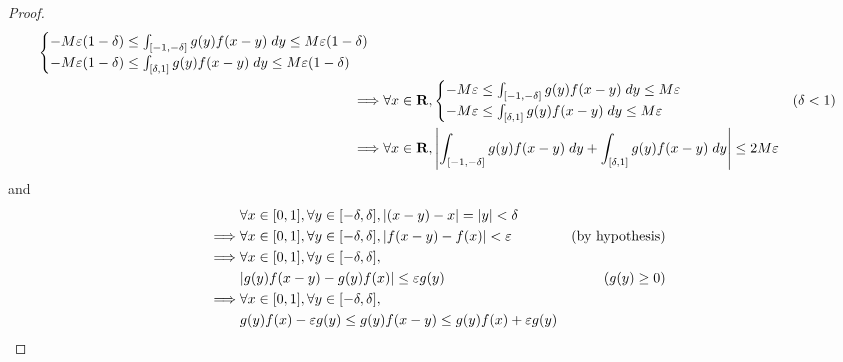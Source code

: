\begin{proof}
\begin{align*}
\begin{cases}
                                                 -M \varepsilon (1 - \delta) \leq \int_{[-1, -\delta]} g(y) f(x - y) \; dy \leq M \varepsilon (1 - \delta) \\
                                                 -M \varepsilon (1 - \delta) \leq \int_{[\delta, 1]} g(y) f(x - y) \; dy \leq M \varepsilon (1 - \delta)
                                             \end{cases} \\
        \implies & \forall x \in \mathbf{R}, \begin{cases}
                                                 -M \varepsilon \leq \int_{[-1, -\delta]} g(y) f(x - y) \; dy \leq M \varepsilon \\
                                                 -M \varepsilon \leq \int_{[\delta, 1]} g(y) f(x - y) \; dy \leq M \varepsilon
                                             \end{cases}                            & (\delta < 1)                           \\
        \implies & \forall x \in \mathbf{R}, \abs*{\int_{[-1, -\delta]} g(y) f(x - y) \; dy + \int_{[\delta, 1]} g(y) f(x - y) \; dy} \leq 2 M \varepsilon
    \end{align*}
    and
    \begin{align*}
                 & \forall x \in [0, 1], \forall y \in [-\delta, \delta], \abs*{(x - y) - x} = \abs*{y} < \delta                                                                       \\
        \implies & \forall x \in [0, 1], \forall y \in [-\delta, \delta], \abs*{f(x - y) - f(x)} < \varepsilon                                   & \text{(by hypothesis)}              \\
        \implies & \forall x \in [0, 1], \forall y \in [-\delta, \delta],                                                                                                              \\
                 & \abs*{g(y) f(x - y) - g(y) f(x)} \leq \varepsilon g(y)                                                                        & (g(y) \geq 0)                       \\
        \implies & \forall x \in [0, 1], \forall y \in [-\delta, \delta],                                                                                                              \\
                 & g(y) f(x) - \varepsilon g(y) \leq g(y) f(x - y) \leq g(y) f(x) + \varepsilon g(y)                                                                                   \\

\end{align*}
\end{proof}
